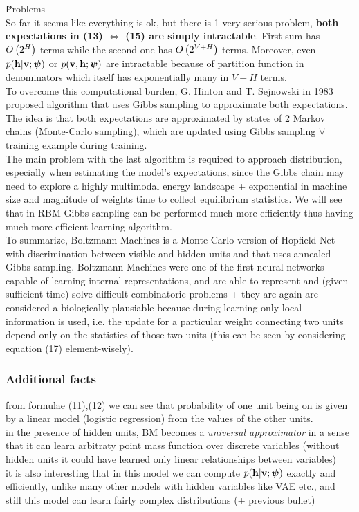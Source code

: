 \u{Problems}
\\
So far it seems like everything is ok, but there is 1 very serious problem, \textbf{both expectations in (13) $\Leftrightarrow$ (15) are simply intractable}. First sum has $O\left(2^H\right)$ terms while the second one has $O\left(2^{V+H}\right)$ terms. Moreover, even $p(\mathbf{h}|\mathbf{v};\boldsymbol{\psi})$ or $p(\mathbf{v},\mathbf{h};\boldsymbol{\psi})$ are intractable because of partition function in denominators which itself has exponentially many in $V+H$ terms.
\\[1em]To overcome this computational burden, G. Hinton and T. Sejnowski in 1983 proposed algorithm that uses Gibbs sampling to approximate both expectations. The idea is that both expectations are approximated by states of 2 Markov chains (Monte-Carlo sampling), which are updated using Gibbs sampling $\forall$ training example during training.
\\[1em]The main problem with the last algorithm is  required to approach distribution, especially when estimating the model's expectations, since the Gibbs chain may need to explore a highly multimodal energy landscape + exponential in machine size and magnitude of weights time to collect equilibrium statistics. We will see that in RBM Gibbs sampling can be performed much more efficiently thus having much more efficient learning algorithm.
\\[1em]
To summarize, Boltzmann Machines is a Monte Carlo version of Hopfield Net with discrimination between visible and hidden units and that uses annealed Gibbs sampling. Boltzmann Machines were one of the first neural networks capable of learning internal representations, and are able to represent and (given sufficient time) solve difficult combinatoric problems + they are again are considered a biologically plausiable because during learning only local information is used, i.e. the update for a particular weight connecting two units depend only on the statistics of those two units (this can be seen by considering equation (17) element-wisely).
\subsubsection{Additional facts}
\textbullet{} from formulae (11),(12) we can see that probability of one unit being on is given by a linear model (logistic regression) from the values of the other units.
\\
\textbullet{} in the presence of hidden units, BM becomes a \emph{universal approximator} in a sense that it can learn arbitraty point mass function over discrete variables (without hidden units it could have learned only linear relationships between variables) \cite{goodfellow2016deep}
\\
\textbullet{} it is also interesting that in this model we can compute $p(\mathbf{h}|\mathbf{v};\boldsymbol{\psi})$ exactly and efficiently, unlike many other models with hidden variables like VAE etc., and still this model can learn fairly complex distributions (+ previous bullet)

